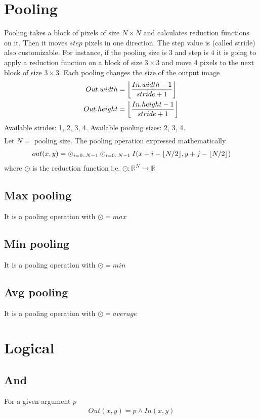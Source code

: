 \documentclass{article}
\DeclarePairedDelimiter\floor{\lfloor}{\rfloor}
\begin{document}
\section{Pooling}
Pooling takes a block of pixels of size $N \times N$ and 
calculates reduction functions on it. Then it moves $step$ pixels in one direction. The step value is (called stride) also customizable.
For instance, if the pooling size is $3$ and step is $4$ it is going to apply a reduction function on a block of size $3 \times 3$ and move 4 pixels to the next block of size $3 \times 3$. Each pooling changes the size of the output image
\begin{gather*}
    Out.width =\floor*{\frac{In.width -1}{stride + 1}}\\
    Out.height = \floor*{\frac{In.height -1}{stride + 1}}\\
\end{gather*}
Available strides: 1, 2, 3, 4. Available pooling sizes: 2, 3, 4.
\begin{gather*}
\end{gather*}
Let $N=$ pooling size. The pooling operation expressed mathematically
\begin{gather*}
    out(x,y) = \odot_{i=0..N-1} \odot_{i=0..N-1} I(x + i - \floor*{N/2}, y + j - \floor*{N/2})
\end{gather*}
where $\odot$ is the reduction function i.e. $\odot: \mathbb{R}^N \longrightarrow \mathbb{R}$
\subsection{Max pooling}
It is a pooling operation with $\odot = max$
\subsection{Min pooling}
It is a pooling operation with $\odot = min$
\subsection{Avg pooling}
It is a pooling operation with $\odot = average$
\section{Logical}
\subsection{And}
For a given argument $p$
\begin{gather*}
    Out(x,y) = p \land In(x, y)
\end{gather*}
\end{document}
